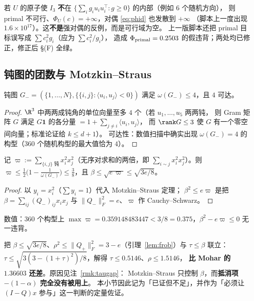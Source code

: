 \begin{remark}[一处必须记录的可行性陷阱]\label{rmk:phitrap}
若 $U$ 的原子使 $I_3$ \textbf{不}在 $\{\sum_ig_iu_iu_i^\top:g\ge0\}$ 的内部（例如 $6$ 个随机方向），
则 primal 不可行、$\Phi_U(c)=+\infty$，对偶 \eqref{eq:phid} 也发散到 $+\infty$
（脚本上一度出现 $1.6\times10^{17}$）。这\textbf{不是}强对偶的反例，而是可行域为空。
上一版脚本还把 primal 目标误写成 $\sum c_i^2g_i$（应为 $\sum c_i^2/g_i$），
造成 $\Phi_{\rm primal}=0.2503$ 的假违背；两处均已修正，修正后 \S(F) 全绿。
\end{remark}

\subsection{钝图的团数与 Motzkin--Straus}\label{sec:r17:ms}

\begin{lemma}[钝团数]\label{lem:obtuseclique}
钝图 $G_-=(\{1,\dots,N\},\{\{i,j\}:\langle u_i,u_j\rangle<0\})$ 满足 $\omega(G_-)\le4$，且 $4$ 可达。
\end{lemma}

\begin{proof}
$\R^3$ 中两两成钝角的单位向量至多 $4$ 个（若 $u_1,\dots,u_5$ 两两钝，
则 Gram 矩阵 $G$ 满足 $G\mathbf 1$ 的各分量 $=1+\sum_{j\ne i}\langle u_i,u_j\rangle$，
而 $\rank G\le3$ 使 $G$ 有一个零空间向量；标准论证给 $k\le d+1$）。
可达性：数值扫描中确实出现 $\omega(G_-)=4$ 的构型（$360$ 个随机构型的最大值恰为 $4$）。
\end{proof}

\begin{corollary}\label{cor:ms}
记 $\varpi:=\sum_{\{i,j\}\text{ 钝}}x_i^2x_j^2$（无序对求和的两倍，即 $\sum_{i\sim j}x_i^2x_j^2$）。则
$\varpi\le\frac12\bigl(1-\frac1{\omega(G_-)}\bigr)\le\frac38$，且 $\beta\le\sqrt{e\,\varpi}\le\sqrt{3e/8}$。
\end{corollary}

\begin{proof}
以 $y_i=x_i^2$（$\sum y_i=1$）代入 Motzkin--Straus 定理；
$\beta^2\le e\varpi$ 是把 $\beta=\sum_{ij}(Q_-)_{ij}x_ix_j$ 与 $\|Q_-\|_F^2=e$、$\varpi$ 作 Cauchy--Schwarz。
\end{proof}

数值：$360$ 个构型上 $\max\varpi=0.359148483447<3/8=0.375$，$\beta^2-e\varpi\le0$ 无一违背。

\begin{remark}\label{rmk:mslimit}
把 $\beta\le\sqrt{3e/8}$、$\rho^2\le\|Q_+\|_F^2=3-e$（引理~\ref{lem:frob}）与 $\tau\le\beta$ 联立：
$\tau\le\sqrt{3(3-(1+\tau)^2)/8}$，解得 $\tau\le0.5146$、$\rho\le1.5146$，
\textbf{比 Mohar 的 $1.36603$ 还差}。原因见注~\ref{rmk:taugap}：
Motzkin--Straus 只控制 $\beta$，而\textbf{抵消项 $-(1-\alpha)$ 完全没有被用上}。
本小节因此记为「已证但不足」，并作为「必须让 $(I-Q)x$ 参与」这一判断的定量佐证。
\end{remark}

